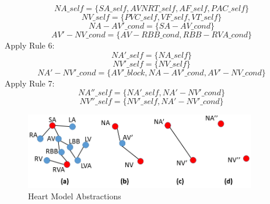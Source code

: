 $$NA\_self=\{SA\_self,AVNRT\_self,AF\_self,PAC\_self\}$$
$$NV\_self=\{PVC\_self,VF\_self,VT\_self\}$$
$$NA-AV'\_cond=\{SA-AV\_cond\}$$
$$AV'-NV\_cond=\{AV-RBB\_cond,RBB-RVA\_cond\}$$
Apply Rule 6:
$$NA'\_self=\{NA\_self\}$$
$$NV'\_self=\{NV\_self\}$$
$$NA'-NV'\_cond=\{AV'\_block,NA-AV'\_cond,AV'-NV\_cond\}$$
Apply Rule 7:
$$NA''\_self=\{NA'\_self,NA'-NV'\_cond\}$$
$$NV''\_self=\{NV'\_self,NA'-NV'\_cond\}$$
\begin{figure}[!t]
		\centering
		\includegraphics[width=0.9\textwidth]{figs/abs.png}
		\caption{\small Heart Model Abstractions}
		\label{fig:abs_exam}
\end{figure}







